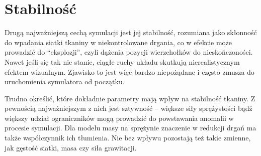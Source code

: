 		
		
		
		
		
		
		
		
		
		
	
	\section{Stabilność}
	\label{t:wyniki:stabilnosc}
	
		Drugą najważniejszą cechą symulacji jest jej stabilność, rozumiana jako skłonność do wpadania siatki tkaniny w niekontrolowane drgania, co w efekcie może prowadzić do ``eksplozji'', czyli dążenia pozycji wierzchołków do nieskończoności. Nawet jeśli się tak nie stanie, ciągłe ruchy układu skutkują nierealistycznym efektem wizualnym. Zjawisko to jest więc bardzo niepożądane i często zmusza do uruchomienia symulatora od początku.
		
		Trudno określić, które dokładnie parametry mają wpływ na stabilność tkaniny. Z pewnością najważniejszym z nich jest sztywność -- większe siły sprężystości bądź większy udział ograniczników mogą prowadzić do powstawania anomalii w procesie symulacji. Dla modelu masy na sprężynie znaczenie w redukcji drgań ma także współczynnik ich tłumienia. Nie bez wpływu pozostają też takie zmienne, jak gęstość siatki, masa czy siła grawitacji.
		
